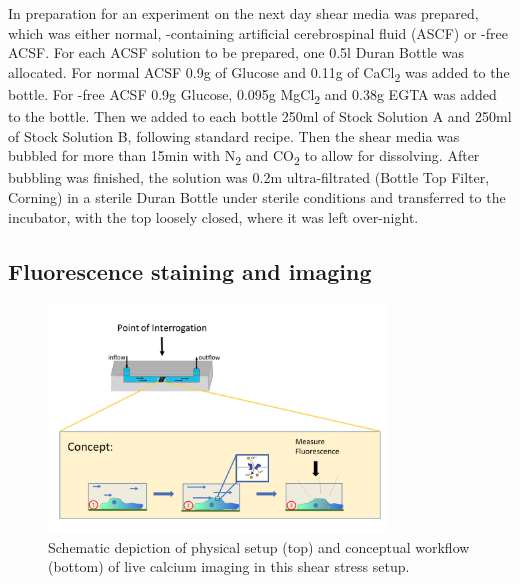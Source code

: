 In preparation for an experiment on the next day shear media was prepared, which was either normal, \calcium{}-containing artificial cerebrospinal fluid (ASCF) or \calcium{}-free ACSF. For each ACSF solution to be prepared, one 0.5l Duran Bottle was allocated. For normal ACSF 0.9g of Glucose and 0.11g of CaCl\textsubscript{2} was added to the bottle. For \calcium{}-free ACSF 0.9g Glucose, 0.095g MgCl\textsubscript{2} and 0.38g EGTA was added to the bottle. Then we added to each bottle 250ml of Stock Solution A and 250ml of Stock Solution B, following standard recipe. Then the shear media was bubbled for more than 15min with N\textsubscript{2} and CO\textsubscript{2} to allow for dissolving. After bubbling was finished, the solution was 0.2\textmu{}m ultra-filtrated (Bottle Top Filter, Corning) in a sterile Duran Bottle under sterile conditions and transferred to the incubator, with the top loosely closed, where it was left over-night.

\subsection{Fluorescence staining and imaging}
\label{sec:LiveImaging}

\begin{figure}
	\centering
	\includegraphics[width = 0.8\textwidth]{FlowChamberSchematic.png}
	\caption{Schematic depiction of physical setup (top) and conceptual workflow (bottom) of live calcium imaging in this shear stress setup.}
	\label{fig:FlowChamberSchematic}
\end{figure}

